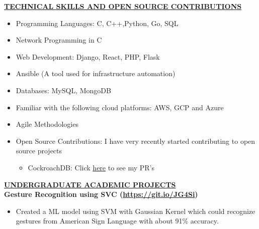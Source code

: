 \documentclass{article}
\begin{document}
\noindent \textbf{\underline{TECHNICAL SKILLS AND OPEN SOURCE CONTRIBUTIONS}}
\begin{itemize}[noitemsep,nolistsep,leftmargin=*]
\item {Programming Languages: C, C++,Python, Go, SQL}
\item {Network Programming in C}
\item {Web Development: Django, React, PHP, Flask}
\item {Ansible (A tool used for infrastructure automation)}
\item {Databases: MySQL, MongoDB}
\item {Familiar with the following cloud platforms: AWS, GCP and Azure}
\item {Agile Methodologies}
\item {Open Source Contributions: I have very recently started contributing to open source projects}
\begin{itemize}
    \item CockroachDB: Click \href{https://github.com/cockroachdb/cockroach/pulls?q=is\%3Apr+author\%3Abiradarganesh25+}{here} to see my PR's \\
\end{itemize}
\end{itemize}

%
%

\noindent \textbf{\underline{UNDERGRADUATE ACADEMIC PROJECTS}} \\
\noindent \textbf{Gesture Recognition using SVC (\url{https://git.io/JG4Si})} 
\begin{itemize}[noitemsep,nolistsep,leftmargin=*]
\item {Created a ML model using SVM with Gaussian Kernel which could recognize gestures from American Sign Language with about 91\% accuracy. \\}
\end{itemize}
\end{document}
